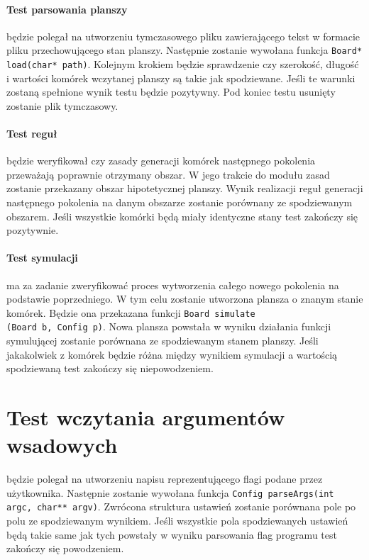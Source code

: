 \documentclass{article}
\begin{document}
\paragraph{Test parsowania planszy} będzie polegał na utworzeniu tymczasowego pliku zawierającego tekst w formacie pliku przechowującego stan planszy. Następnie zostanie wywołana funkcja \texttt{Board* load(char* path)}. Kolejnym krokiem będzie sprawdzenie czy szerokość, długość i wartości komórek wczytanej planszy są takie jak spodziewane. Jeśli te warunki zostaną spełnione wynik testu będzie pozytywny. Pod koniec testu usunięty zostanie plik tymczasowy.

\paragraph{Test reguł} będzie weryfikował czy zasady generacji komórek następnego pokolenia przeważają poprawnie otrzymany obszar. W jego trakcie do modułu zasad zostanie przekazany obszar hipotetycznej planszy. Wynik realizacji reguł generacji następnego pokolenia na danym obszarze zostanie porównany ze spodziewanym obszarem. Jeśli wszystkie komórki będą miały identyczne stany test zakończy się pozytywnie.

\paragraph{Test symulacji} ma za zadanie zweryfikować proces wytworzenia całego nowego pokolenia na podstawie poprzedniego. W tym celu zostanie utworzona plansza o znanym stanie komórek. Będzie ona przekazana funkcji \texttt{Board simulate\\(Board b, Config p)}. Nowa plansza powstała w wyniku działania funkcji symulującej zostanie porównana ze spodziewanym stanem planszy. Jeśli jakakolwiek z komórek będzie różna między wynikiem symulacji a wartością spodziewaną test zakończy się niepowodzeniem.

\section{Test wczytania argumentów wsadowych} będzie polegał na utworzeniu napisu reprezentującego flagi podane przez użytkownika. Następnie zostanie wywołana funkcja \texttt{Config parseArgs(int argc, char** argv)}. Zwrócona struktura ustawień zostanie porównana pole po polu ze spodziewanym wynikiem. Jeśli wszystkie pola spodziewanych ustawień będą takie same jak tych powstały w wyniku parsowania flag programu test zakończy się powodzeniem.
\end{document}
